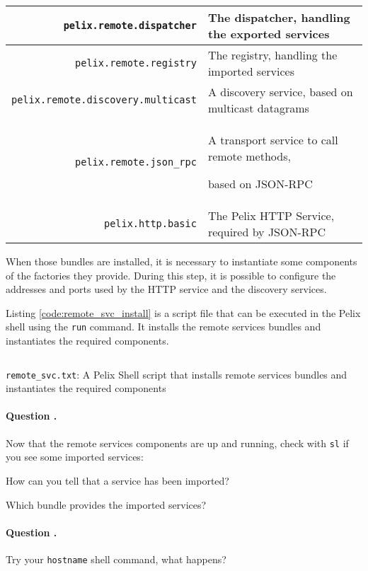 \documentclass[a4paper, 12pt]{article}
\newcounter{question}
\newcommand\Question{%
  \stepcounter{question}%
  \paragraph{\hspace{2ex} Question \thequestion.}
}
\let\tempone\itemize
\let\temptwo\enditemize
\renewenvironment{itemize}{\tempone\addtolength{\itemsep}{-.5em}}{\temptwo}
\begin{document}
\begin{center}
\begin{tabularx}{.95\textwidth}{r X}
\texttt{\footnotesize pelix.remote.dispatcher} & The dispatcher, handling the exported services \\
\hline
\texttt{\footnotesize pelix.remote.registry} & The registry, handling the imported services \\
\hline
\texttt{\footnotesize pelix.remote.discovery.multicast} & A discovery service, based on multicast datagrams \\
\hline
\texttt{\footnotesize pelix.remote.json\_rpc} & A transport service to call remote methods, \par based on JSON-RPC \\
\hline
\texttt{\footnotesize pelix.http.basic} & The Pelix HTTP Service, required by JSON-RPC \\
\end{tabularx}
\end{center}

When those bundles are installed, it is necessary to instantiate some components of the factories they provide.
During this step, it is possible to configure the addresses and ports used by the HTTP service and the discovery services.

Listing \ref{code:remote_svc_install} is a script file that can be executed in the Pelix shell using the \texttt{run} command.
It installs the remote services bundles and instantiates the required components.

\begin{listing}[!hb]
\inputminted[fontsize=\footnotesize, frame=lines, framesep=2mm, baselinestretch=1.2, bgcolor=LightGray, linenos]{python}{../remote_svc.txt}
\caption{\texttt{remote\_svc.txt}: A Pelix Shell script that installs remote services bundles and instantiates the required components}
\label{code:remote_svc_install}
\end{listing}

\Question Now that the remote services components are up and running, check with \texttt{sl} if you see some imported services:
\begin{itemize}
\item How can you tell that a service has been imported?
\item Which bundle provides the imported services?
\end{itemize}

\Question Try your \texttt{hostname} shell command, what happens?
\end{document}
